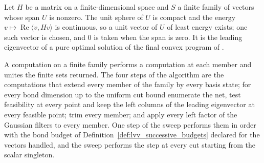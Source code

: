 \begin{definition}
    \label{def:lvv_energy_minimizer}
    \leanok
    Let $H$ be a matrix on a finite-dimensional space and $S$ a finite family
    of vectors whose span $U$ is nonzero. The unit sphere of $U$ is compact and
    the energy $v\mapsto\operatorname{Re}\langle v,Hv\rangle$ is continuous,
    so a unit vector of $U$ of least energy exists; one such vector is chosen,
    and $0$ is taken when the span is zero. It is the leading eigenvector of a
    pure optimal solution of the final convex program of
    \cite{Landau2015Polynomial}.
\end{definition}

\begin{definition}
    \label{def:lvv_step_programs}
    \leanok
    A computation on a finite family performs a computation at each member and
    unites the finite sets returned. The four steps of the algorithm are the
    computations that extend every member of the family by every basis state;
    for every bond dimension up to the uniform cut bound enumerate the net,
    test feasibility at every point and keep the left columns of the leading
    eigenvector at every feasible point; trim every member; and apply every
    left factor of the Gaussian filters to every member. One step of the sweep
    performs them in order with the bond budget of
    Definition~\ref{def:lvv_successive_budgets} declared for the vectors
    handled, and the sweep performs the step at every cut starting from the
    scalar singleton.
\end{definition}

